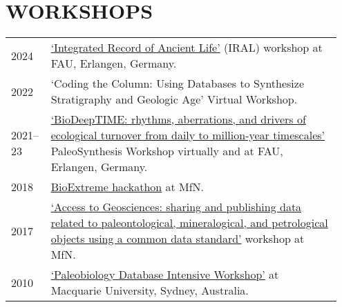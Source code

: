 \documentclass[11pt, a4paper]{article}
\begin{document}
\section{WORKSHOPS}
\begin{longtable}{@{}p{0.1\linewidth} >{\small}P{0.85\linewidth}@{}}
2024 & \href{https://integrated-record.github.io/}{`Integrated Record of Ancient Life'} (IRAL) workshop at FAU, Erlangen, Germany.\\
2022 & `Coding the Column: Using Databases to Synthesize Stratigraphy and Geologic Age' Virtual Workshop.\\
2021--23 & \href{https://www.paleosynthesis.nat.fau.de/index.php/biodeeptime/}{`BioDeepTIME: rhythms, aberrations, and drivers of ecological turnover from daily to million-year timescales'} PaleoSynthesis Workshop virtually and at FAU, Erlangen, Germany.\\
2018 & \href{https://github.com/macroecology/BioExtremes}{BioExtreme hackathon} at MfN.\\
2017 & \href{https://abcd.biowikifarm.net/wiki/Events:WorkshopEFG2017}{`Access to Geosciences: sharing and publishing data related to paleontological, mineralogical, and petrological objects using a common data standard'} workshop at MfN.\\
2010 & \href{http://fossilworks.org/?page=workshop}{`Paleobiology Database Intensive Workshop'} at Macquarie University, Sydney, Australia.\\
\end{longtable}
\end{document}
